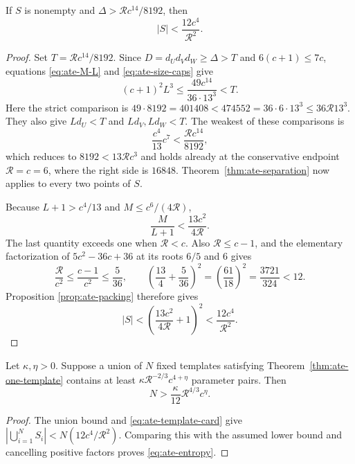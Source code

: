 \begin{theorem}
\label{thm:ate-one-template}
If $S$ is nonempty and $\Delta>\mathcal Rc^{14}/8192$, then
\begin{equation}\label{eq:ate-template-card}
 |S|<\frac{12c^4}{\mathcal R^2}.
\end{equation}
\end{theorem}

\begin{proof}
Set $T=\mathcal Rc^{14}/8192$.  Since $D=d_Ud_Vd_W\ge\Delta>T$ and
$6(c+1)\le7c$, equations \eqref{eq:ate-M-L} and
\eqref{eq:ate-size-caps} give
\[
 (c+1)^2L^3\le\frac{49c^{14}}{36\cdot13^3}<T.
\]
Here the strict comparison is
$49\cdot8192=401408<474552=36\cdot6\cdot13^3
\le36\mathcal R13^3$.
They also give $Ld_U<T$ and $Ld_V,Ld_W<T$.  The weakest of these
comparisons is
\[
 \frac{c^4}{13}c^7<\frac{\mathcal Rc^{14}}{8192},
\]
which reduces to $8192<13\mathcal Rc^3$ and holds already at the
conservative endpoint $\mathcal R=c=6$, where the right side is $16848$.
Theorem~\ref{thm:ate-separation} now applies to every two points of $S$.

Because $L+1>c^4/13$ and $M\le c^6/(4\mathcal R)$,
\[
 \frac{M}{L+1}<\frac{13c^2}{4\mathcal R}.
\]
The last quantity exceeds one when $\mathcal R<c$.  Also
$\mathcal R\le c-1$, and the elementary factorization of
$5c^2-36c+36$ at its roots $6/5$ and $6$ gives
\[
 \frac{\mathcal R}{c^2}\le\frac{c-1}{c^2}\le\frac5{36},
 \qquad
 \left(\frac{13}{4}+\frac5{36}\right)^2
 =\left(\frac{61}{18}\right)^2
 =\frac{3721}{324}<12.
\]
Proposition \ref{prop:ate-packing} therefore gives
\[
 |S|<\left(\frac{13c^2}{4\mathcal R}+1\right)^2
 <\frac{12c^4}{\mathcal R^2}.
\]
\end{proof}

\begin{corollary}
\label{cor:ate-entropy}
Let $\kappa,\eta>0$.  Suppose a union of $N$ fixed templates satisfying
Theorem~\ref{thm:ate-one-template} contains at least
$\kappa\mathcal R^{-2/3}c^{4+\eta}$ parameter pairs.  Then
\begin{equation}\label{eq:ate-entropy}
 N>\frac{\kappa}{12}\mathcal R^{4/3}c^\eta.
\end{equation}
\end{corollary}

\begin{proof}
The union bound and \eqref{eq:ate-template-card} give
$|\bigcup_{i=1}^N S_i|<N(12c^4/\mathcal R^2)$.  Comparing this with the
assumed lower bound and cancelling positive factors proves
\eqref{eq:ate-entropy}.
\end{proof}

